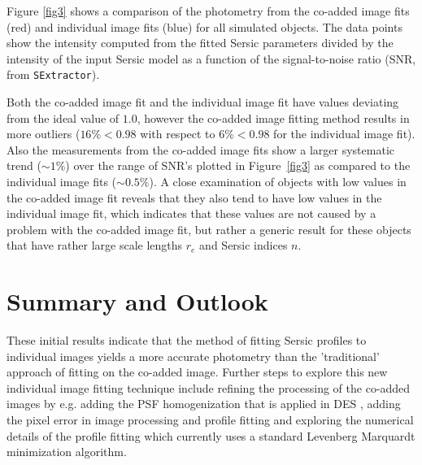 Figure \ref{fig3} shows a comparison of the photometry from the co-added image fits (red) and individual image fits (blue) for all simulated objects. The data points show the intensity computed from the fitted Sersic parameters divided by the intensity of the input Sersic model as a function of the signal-to-noise ratio (SNR, from {\tt {}SExtractor}).

Both the co-added image fit and the individual image fit have values deviating from the ideal value of $1.0$, however the co-added image fitting method results in more outliers ($16\%< 0.98$ with respect to $6\% < 0.98$ for the individual image fit). Also the measurements from the co-added image fits show a larger systematic trend ($\sim1\%$) over the range of SNR's plotted in Figure~\ref{fig3} as compared to the individual image fits ($\sim0.5\%$). A close examination of objects with low values in the co-added image fit reveals that they also tend to have low values in the individual image fit, which indicates that these values are not caused by a problem with the co-added image fit, but rather a generic result for these objects that have rather large scale lengths $r_e$ and Sersic indices $n$.

\section{Summary and Outlook}
These initial results indicate that the method of fitting Sersic profiles to individual images yields a more accurate photometry than the 'traditional' approach of fitting on the co-added image. Further steps to explore this new individual image fitting technique include refining the processing of the co-added images by e.g. adding the PSF homogenization that is applied in DES \citep{2008SPIE.7016E..17M}, adding the pixel error in image processing and profile fitting and exploring the numerical details of the profile fitting which currently uses a standard Levenberg Marquardt minimization algorithm.



